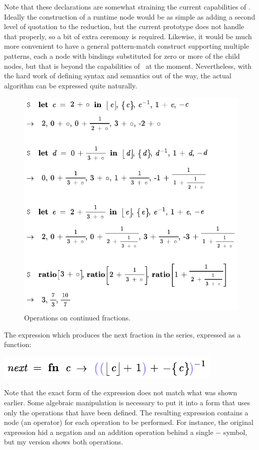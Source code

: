 Note that these declarations are somewhat straining the current capabilities of \Meta. Ideally the construction of a runtime node would be as simple as adding a second level of quotation to the  reduction, but the current prototype does not handle that properly, so a bit of extra ceremony is required. Likewise, it would be much more convenient to have a general pattern-match construct supporting multiple patterns, each a node with bindings substituted for zero or more of the child nodes, but that is beyond the capabilities of \Meta\ at the moment. Nevertheless, with the hard work of defining syntax and semantics out of the way, the actual algorithm can be expressed quite naturally.

\begin{figure}[th]
  \begin{center}
  
  \includegraphics[scale=0.8]{src/image/continued.pdf}
    
  \end{center}
  \caption{Operations on continued fractions.}
  \label{fig-cfex}
\end{figure}

The expression which produces the next fraction in the series, expressed as a function:
\begin{center}
\includegraphics[scale=1]{src/image/rationals-next.pdf}
\end{center}
Note that the exact form of the expression does not match what was shown earlier. Some algebraic manipulation is necessary to put it into a form that uses only the operations that have been defined. The resulting expression contains a node (an operator) for each operation to be performed. For instance, the original expression hid a negation and an addition operation behind a single $-$ symbol, but my version shows both operations.

